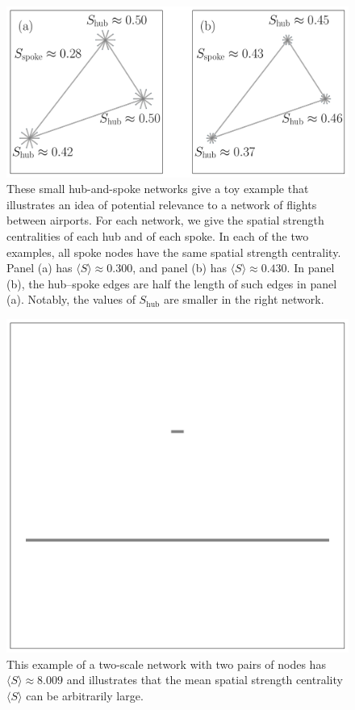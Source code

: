 \documentclass[%
 reprint,
 amsmath,amssymb,
 aps,
]{revtex4-1}
\begin{document}
\begin{figure}
    \centering
    \includegraphics[width=1.0\linewidth]{hub_spoke_detailed2.pdf}
    \caption{These small hub-and-spoke networks give a toy example that illustrates an idea of potential relevance to a network of flights between airports. For each network, we give the spatial strength centralities of each hub and of each spoke. In each of the two examples, all spoke nodes have the same spatial strength centrality. Panel (a) has $\langle S \rangle \approx 0.300$, and panel (b) has $\langle S \rangle \approx 0.430$. In panel (b), the hub--spoke edges are half the length of such
    edges in panel (a). Notably, the values of $S_{\text{hub}}$ are smaller in the right network.
    }
    \label{fig:hub_spoke_example}
\end{figure}


\begin{figure}
    \centering
    \includegraphics[width=0.4\linewidth]{breaking_example_spatial_strength.pdf}
    \caption{This example of a two-scale network with two pairs of nodes has $\langle S \rangle \approx 8.009$ and illustrates that the mean spatial strength centrality $\langle S \rangle$ can be arbitrarily large.
    }
    \label{fig:breaking_example}
\end{figure}
\end{document}
